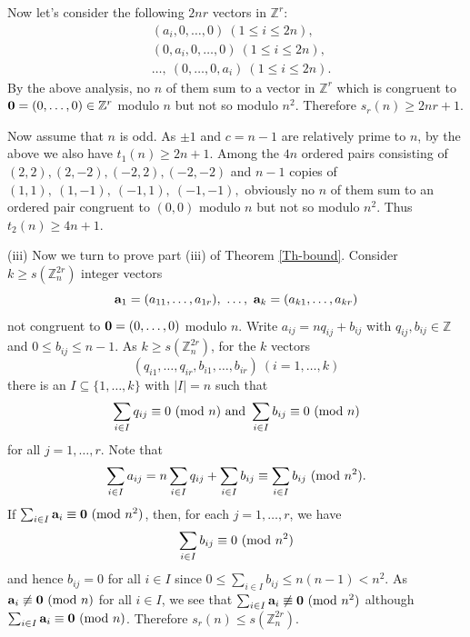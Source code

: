 \documentclass[11pt,reqno]{amsart}
\def\pmod #1{\ ({\rm{mod}}\ #1)}
\def\Z{\mathbb Z}
\def\t{\text}
\def\ls{\leqslant}
\def\gs{\geqslant}
\def\se {\subseteq}
\def\eq{\equiv}
\theoremstyle{plain}
\theoremstyle{definition}
\theoremstyle{remark}
\begin{document}
Now let's consider the following $2nr$ vectors in $\Z^r$:
\begin{align*}&(a_i,0,\ldots,0)\ (1\ls i\ls 2n),
\\& (0,a_i,0,\ldots,0)\ (1\ls i\ls 2n),
\\& \ldots,\ (0,\ldots,0,a_i)\ (1\ls i\ls 2n).
\end{align*}
By the above analysis, no $n$ of them sum to a vector in $\Z^r$
which is congruent to ${\bf 0}=(0,\ldots,0)\in\Z^r$ modulo $n$
but not so modulo $n^2$. Therefore $s_r(n)\gs 2nr+1$.

Now assume that $n$ is odd.
As $\pm1$ and $c=n-1$ are relatively prime to $n$,
by the above we also have $t_1(n)\gs 2n+1$.
Among the $4n$ ordered pairs
consisting of $(2,2),(2,-2),(-2,2),(-2,-2)$ and $n-1$ copies of
$(1,1),\ (1,-1),\ (-1,1),\ (-1,-1),$
obviously no $n$ of them sum to an ordered pair congruent to $(0,0)$ modulo $n$ but not so modulo $n^2$. Thus $t_2(n)\gs 4n+1$.

(iii) Now we turn to prove part (iii) of Theorem \ref{Th-bound}.
Consider  $k\gs s(\Z_n^{2r})$ integer vectors
$${\bf a}_1=(a_{11},\ldots,a_{1r}),\ \ldots,\ {\bf a}_k=(a_{k1},\ldots,a_{kr})$$
not congruent to ${\bf 0}=(0,\ldots,0)$ modulo $n$.
Write $a_{ij}=nq_{ij}+b_{ij}$ with $q_{ij},b_{ij}\in\Z$ and $0\ls b_{ij}\ls n-1$.
As $k\gs s(\Z_n^{2r})$, for the $k$ vectors
$$(q_{i1},\ldots,q_{ir},b_{i1},\ldots,b_{ir})\ (i=1,\ldots,k)$$
there is an $I\se\{1,\ldots,k\}$ with $|I|=n$
such that
$$\sum_{i\in I}q_{ij}\eq0\pmod n\ \t{and}\ \sum_{i\in I} b_{ij}\eq0\pmod n$$
for all $j=1,\ldots,r$. Note that
$$\sum_{i\in I}a_{ij}=n\sum_{i\in I}q_{ij}+\sum_{i\in I} b_{ij}\eq \sum_{i\in I}b_{ij}\pmod{n^2}.$$
If $\sum_{i\in I}{\bf a}_{i}\eq{\bf 0}\pmod {n^2}$, then, for each $j=1,\ldots,r$, we have
$$\sum_{i\in I}b_{ij}\eq0\pmod{n^2}$$
and hence $b_{ij}=0$ for all $i\in I$ since $0\ls \sum_{i\in I}b_{ij}\ls n(n-1)<n^2$.
As ${\bf a}_i\not\eq{\bf 0}\pmod n$ for all $i\in I$, we see that
$\sum_{i\in I}{\bf a}_{i}\not\eq{\bf 0}\pmod {n^2}$ although $\sum_{i\in I}{\bf a}_{i}\eq{\bf 0}\pmod {n}$. Therefore $s_r(n)\ls s(\Z_n^{2r})$.
\end{document}
